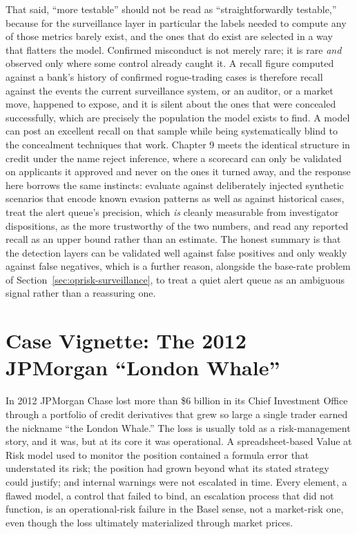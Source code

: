 \documentclass[../ai_in_finance]{subfiles}
\begin{document}
That said, ``more testable'' should not be read as ``straightforwardly testable,'' because for the surveillance layer in particular the labels needed to compute any of those metrics barely exist, and the ones that do exist are selected in a way that flatters the model. Confirmed misconduct is not merely rare; it is rare \emph{and} observed only where some control already caught it. A recall figure computed against a bank's history of confirmed rogue-trading cases is therefore recall against the events the current surveillance system, or an auditor, or a market move, happened to expose, and it is silent about the ones that were concealed successfully, which are precisely the population the model exists to find. A model can post an excellent recall on that sample while being systematically blind to the concealment techniques that work. Chapter 9 meets the identical structure in credit under the name reject inference, where a scorecard can only be validated on applicants it approved and never on the ones it turned away, and the response here borrows the same instincts: evaluate against deliberately injected synthetic scenarios that encode known evasion patterns as well as against historical cases, treat the alert queue's precision, which \emph{is} cleanly measurable from investigator dispositions, as the more trustworthy of the two numbers, and read any reported recall as an upper bound rather than an estimate. The honest summary is that the detection layers can be validated well against false positives and only weakly against false negatives, which is a further reason, alongside the base-rate problem of Section~\ref{sec:oprisk-surveillance}, to treat a quiet alert queue as an ambiguous signal rather than a reassuring one.

\section{Case Vignette: The 2012 JPMorgan ``London Whale''}
\label{sec:oprisk-vignette}

In 2012 JPMorgan Chase lost more than \$6 billion in its Chief Investment Office through a portfolio of credit derivatives that grew so large a single trader earned the nickname ``the London Whale.'' The loss is usually told as a risk-management story, and it was, but at its core it was operational. A spreadsheet-based Value at Risk model used to monitor the position contained a formula error that understated its risk; the position had grown beyond what its stated strategy could justify; and internal warnings were not escalated in time. Every element, a flawed model, a control that failed to bind, an escalation process that did not function, is an operational-risk failure in the Basel sense, not a market-risk one, even though the loss ultimately materialized through market prices.
\end{document}
